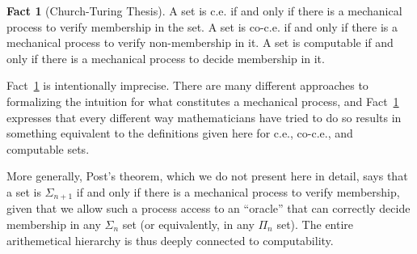 \documentclass{article}
\theoremstyle{plain}
\theoremstyle{definition}
\newtheorem{fact}[thm]{Fact}
\begin{document}
\begin{fact}[Church-Turing Thesis]\label{fact:ct-thesis}
  A set is c.e. if and only if there is a mechanical process to verify
  membership in the set. A set is co-c.e. if and only if there is a
  mechanical process to verify non-membership in it. A set is
  computable if and only if there is a mechanical process to decide
  membership in it.
\end{fact}

Fact~\ref{fact:ct-thesis} is intentionally imprecise. There are many
different approaches to formalizing the intuition for what constitutes
a mechanical process, and Fact~\ref{fact:ct-thesis} expresses that
every different way mathematicians have tried to do so results in
something equivalent to the definitions given here for c.e., co-c.e.,
and computable sets.

More generally, Post's theorem, which we do not present here in
detail, says that a set is $\Sigma_{n+1}$ if and only if there is a
mechanical process to verify membership, given that we allow such a
process access to an ``oracle'' that can correctly decide membership
in any $\Sigma_n$ set (or equivalently, in any $\Pi_n$ set). The
entire arithemetical hierarchy is thus deeply connected to
computability.
\end{document}
